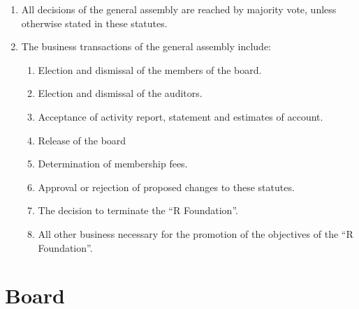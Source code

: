\documentclass[a4paper]{article}
\newcommand{\RF}{"`R Foundation"'}
\begin{document}
\begin{enumerate}
 \item All decisions of the general assembly are reached by majority
  vote, unless otherwise stated in these statutes.
  
 \item The business transactions of the general assembly include:
  \begin{enumerate}
   \item Election and dismissal of the members of the board.
   \item Election and dismissal of the auditors.
   \item Acceptance of activity report, statement and estimates of
    account.
   \item Release of the board
   \item Determination of membership fees.
   \item Approval or rejection of proposed changes to these statutes.
   \item The decision to terminate the \RF{}.
   \item All other business necessary for the promotion of the
    objectives of the \RF{}.
  \end{enumerate}
\end{enumerate}

\section{Board}
\end{document}
